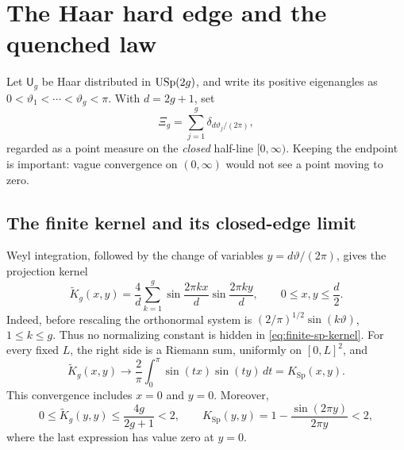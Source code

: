 \section{The Haar hard edge and the quenched law}
\label{sec:hard-edge}

Let \(\mathsf U_g\) be Haar distributed in \(\mathrm{USp}(2g)\), and write its positive
eigenangles as
\(0<\vartheta_1<\cdots<\vartheta_g<\pi\).  With \(d=2g+1\), set
\[
 \Xi_g=\sum_{j=1}^g\delta_{d\vartheta_j/(2\pi)},
\]
regarded as a point measure on the \emph{closed} half-line
\([0,\infty)\).  Keeping the endpoint is important: vague convergence on
\((0,\infty)\) would not see a point moving to zero.

\subsection{The finite kernel and its closed-edge limit}

Weyl integration, followed by the change of variables
\(y=d\vartheta/(2\pi)\), gives the projection kernel
\begin{equation}
 \widetilde K_g(x,y)=\frac4d\sum_{k=1}^g
   \sin\frac{2\pi kx}{d}\sin\frac{2\pi ky}{d},
 \qquad 0\le x,y\le \frac d2 .
 \label{eq:finite-sp-kernel}
\end{equation}
Indeed, before rescaling the orthonormal system is
\((2/\pi)^{1/2}\sin(k\vartheta)\), \(1\le k\le g\).  Thus no
normalizing constant is hidden in \eqref{eq:finite-sp-kernel}.  For every
fixed \(L\), the right side is a Riemann sum, uniformly on
\([0,L]^2\), and
\begin{equation}
 \widetilde K_g(x,y)\longrightarrow
 \frac2\pi\int_0^\pi\sin(tx)\sin(ty)\,dt
 =K_{\mathrm{Sp}}(x,y).
 \label{eq:kernel-riemann-limit}
\end{equation}
This convergence includes \(x=0\) and \(y=0\).  Moreover,
\begin{equation}
 0\le \widetilde K_g(y,y)\le \frac{4g}{2g+1}<2,
 \qquad
 K_{\mathrm{Sp}}(y,y)
 =1-\frac{\sin(2\pi y)}{2\pi y}<2,
 \label{eq:kernel-diagonal-envelope}
\end{equation}
where the last expression has value zero at \(y=0\).

